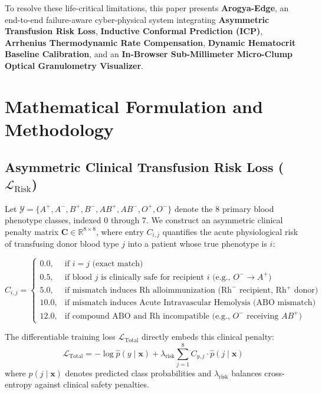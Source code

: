 \documentclass[11pt,a4paper]{article}
\begin{document}
To resolve these life-critical limitations, this paper presents \textbf{Arogya-Edge}, an end-to-end failure-aware cyber-physical system integrating \textbf{Asymmetric Transfusion Risk Loss}, \textbf{Inductive Conformal Prediction (ICP)}, \textbf{Arrhenius Thermodynamic Rate Compensation}, \textbf{Dynamic Hematocrit Baseline Calibration}, and an \textbf{In-Browser Sub-Millimeter Micro-Clump Optical Granulometry Visualizer}.

\section{Mathematical Formulation and Methodology}

\subsection{Asymmetric Clinical Transfusion Risk Loss ($\mathcal{L}_{\text{Risk}}$)}
Let $\mathcal{Y} = \{A^+, A^-, B^+, B^-, AB^+, AB^-, O^+, O^-\}$ denote the 8 primary blood phenotype classes, indexed $0$ through $7$. We construct an asymmetric clinical penalty matrix $\mathbf{C} \in \mathbb{R}^{8 \times 8}$, where entry $C_{i, j}$ quantifies the acute physiological risk of transfusing donor blood type $j$ into a patient whose true phenotype is $i$:

\begin{equation}
C_{i, j} = \begin{cases}
0.0, & \text{if } i = j \text{ (exact match)} \\
0.5, & \text{if blood } j \text{ is clinically safe for recipient } i \text{ (e.g., } O^- \to A^+\text{)} \\
5.0, & \text{if mismatch induces Rh alloimmunization (Rh}^- \text{ recipient, Rh}^+ \text{ donor)} \\
10.0, & \text{if mismatch induces Acute Intravascular Hemolysis (ABO mismatch)} \\
12.0, & \text{if compound ABO and Rh incompatible (e.g., } O^- \text{ receiving } AB^+\text{)}
\end{cases}
\end{equation}

The differentiable training loss $\mathcal{L}_{\text{Total}}$ directly embeds this clinical penalty:
\begin{equation}
\mathcal{L}_{\text{Total}} = -\log \hat{p}(y \mid \mathbf{x}) + \lambda_{\text{risk}} \sum_{j=1}^{8} C_{y, j} \cdot \hat{p}(j \mid \mathbf{x})
\end{equation}
where $\hat{p}(j \mid \mathbf{x})$ denotes predicted class probabilities and $\lambda_{\text{risk}}$ balances cross-entropy against clinical safety penalties.
\end{document}
